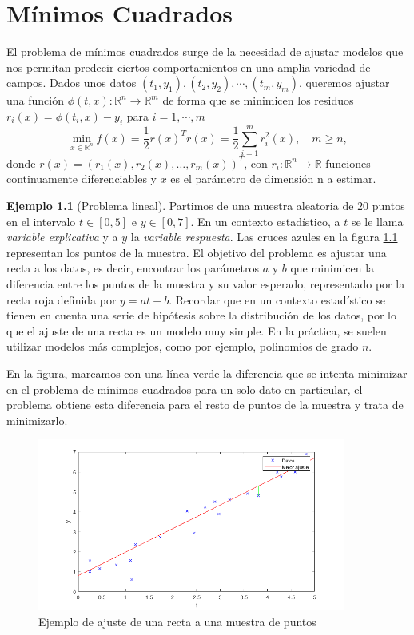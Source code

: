 \documentclass[11pt,a4paper]{book}
\theoremstyle{definition}
\newtheorem{ejemplo}[theorem]{Ejemplo}
\theoremstyle{remark}
\begin{document}
\chapter{Mínimos Cuadrados}\label{ch:lsqp}

El problema de mínimos cuadrados surge de la necesidad de ajustar modelos que nos permitan predecir ciertos comportamientos en una amplia variedad de campos. Dados unos datos $(t_1,y_1),(t_2,y_2),\cdots,(t_m,y_m)$, queremos ajustar una función
$\phi(t,x):\mathbb{R}^{n} \rightarrow \mathbb{R}^{m}$ de forma que se minimicen los residuos $r_i(x) = \phi(t_i,x) - y_i$ para $i=1,\cdots,m$
\begin{equation}
	\min_{x\in \mathbb{R}^{n}}f(x) = \frac{1}{2} r(x)^Tr(x) = \frac{1}{2}\sum_{i=1}^{m}r_i^2(x), \quad m\geq n,
	\label{eq:lsp}
\end{equation}
donde $r(x) = (r_1(x), r_2(x), \ldots, r_m(x))^T$, con $r_i : \mathbb{R}^{n} \rightarrow \mathbb{R}$
funciones continuamente diferenciables y $x$ es el parámetro de dimensión n a estimar.

\begin{ejemplo}[Problema lineal]
Partimos de una muestra
	aleatoria de $20$ puntos en el intervalo $t\in [0,5]$ e $y\in [0,7]$. En un contexto estadístico, a $t$ se le llama \textit{variable explicativa} y a $y$ la \textit{variable respuesta}. Las cruces azules en la figura \ref{fig:lsqlin} representan los puntos de la muestra. El objetivo del problema es ajustar una recta a los datos, es decir, encontrar los parámetros $a$ y $b$ que minimicen la diferencia entre los puntos de la muestra y su valor esperado, representado por la recta roja definida por $y=at+b$. Recordar que en un contexto estadístico se tienen en cuenta una serie de hipótesis sobre la distribución de los datos, por lo que el ajuste de una recta es un modelo muy simple. En la práctica, se suelen utilizar modelos más complejos, como por ejemplo, polinomios de grado $n$.

	En la figura, marcamos con una línea verde la diferencia que se intenta minimizar en el problema de mínimos cuadrados para un solo dato en particular, el problema obtiene esta diferencia para el resto de puntos de la muestra y trata de minimizarlo.
\end{ejemplo}
\newpage
\begin{figure}[h]
	\centering
	\includegraphics[width=0.9\textwidth]{imgs/examplelsqlin.png}
	\caption{Ejemplo de ajuste de una recta a una muestra de puntos}
	\label{fig:lsqlin}
\end{figure}
\end{document}
